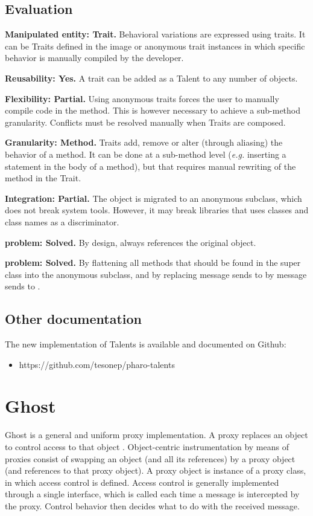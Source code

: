 \documentclass[10pt,twoside,english]{_support/latex/sbabook/sbabook}
\begin{document}
\section{Evaluation}
\textbf{Manipulated entity: Trait.} Behavioral variations are expressed using traits. It can be Traits defined in the image or anonymous trait instances in which specific behavior is manually compiled by the developer.

\textbf{Reusability: Yes.} A trait can be added as a Talent to any number of objects.

\textbf{Flexibility: Partial.} Using anonymous traits forces the user to manually compile code in the method. This is however necessary to achieve a sub-method granularity. Conflicts must be resolved manually when Traits are composed.

\textbf{Granularity: Method.} Traits add, remove or alter (through aliasing) the behavior of a method. It can be done at a sub-method level (\textit{e.g.} inserting a statement in the body of a method), but that requires manual rewriting of the method in the Trait.

\textbf{Integration: Partial.} The object is migrated to an anonymous subclass, which does not break system tools. However, it may break libraries that uses classes and class names as a discriminator.

\textbf{ problem: Solved.} By design,  always references the original object.

\textbf{ problem: Solved.} By flattening all methods that should be found in the super class into the anonymous subclass, and by replacing message sends to  by message sends to .
\section{Other documentation}
The new implementation of Talents is available and documented on Github:

\begin{itemize}
\item https://github.com/tesonep/pharo-talents
\end{itemize}
\chapter{Ghost}
Ghost is a general and uniform proxy implementation\cite{Mart14z}. A proxy replaces an object to control access to that object \cite{alpert1998design}. Object-centric instrumentation by means of proxies consist of swapping an object (and all its references) by a proxy object (and references to that proxy object). A proxy object is instance of a proxy class, in which access control is defined. Access control is generally implemented through a single interface, which is called each time a message is intercepted by the proxy. Control behavior then decides what to do with the received message.
\end{document}
